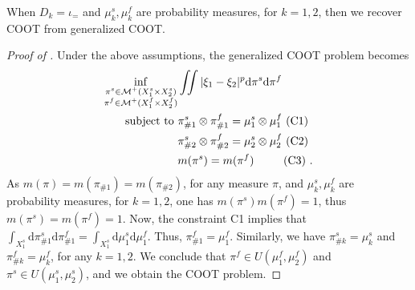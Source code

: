 \begin{claim}
  \label{claim:ucoot_to_coot}
  When $D_k = \iota_{=}$ and $\mu_k^s, \mu_k^f$ are probability measures, for $k=1,2$,
  then we recover COOT from generalized COOT.
\end{claim}
\begin{proof}[Proof of ]
  Under the above assumptions, the generalized COOT problem becomes
  \begin{equation}
    \begin{split}
      \inf_{\substack{\pi^s \in \mathcal M^+(X_1^s \times X_2^s) \\
      \pi^f \in \mathcal M^+(X_1^f \times X_2^f)}}
      &\iint |\xi_1 - \xi_2|^p \mathrm d\pi^s \mathrm d \pi^f \\
      \text{subject to } &\pi^s_{\#1} \otimes \pi^f_{\#1} = \mu_1^s \otimes \mu_1^f \text{ (C1) } \\
      & \pi^s_{\#2} \otimes \pi^f_{\#2} = \mu_2^s \otimes \mu_2^f \text{ (C2) } \\
      & m(\pi^s) = m(\pi^f) \quad \quad \; \text{ (C3) }.
    \end{split}
  \end{equation}
  As $m(\pi) = m(\pi_{\#1}) = m(\pi_{\#2})$,
  for any measure $\pi$, and $\mu_k^s, \mu_k^f$ are probability measures, for $k=1,2$,
  one has $m(\pi^s) m(\pi^f) = 1$, thus $m(\pi^s) = m(\pi^f) = 1$.
  Now, the constraint C1 implies that
  $\int_{X_1^s} \mathrm d\pi^s_{\#1} \mathrm d \pi^f_{\#1}
  = \int_{X_1^s} \mathrm d\mu_1^s \mathrm d\mu_1^f$. Thus, $\pi^f_{\#1} = \mu_1^f$.
  Similarly, we have $\pi^s_{\#k} = \mu_k^s$ and $\pi^f_{\#k} = \mu_k^f$, for any $k=1,2$.
  We conclude that $\pi^f \in U(\mu_1^f, \mu_2^f)$ and $\pi^s \in U(\mu_1^s, \mu_2^s)$,
  and we obtain the COOT problem.
\end{proof}

